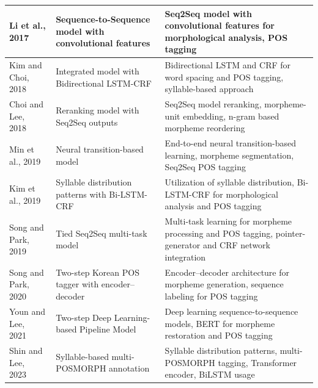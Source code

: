 \documentclass[AMS,STIX2COL]{WileyNJD-v2}
\begin{document}
\begin{table}[ht]
\begin{tabular}{|p{10mm}|p{24mm}|p{40mm}|}
            \hline
            Li et al., 2017~\cite{Li2017}         & Sequence-to-Sequence model with convolutional features & Seq2Seq model with convolutional features for morphological analysis, POS tagging                                \\
            \hline
            Kim and Choi, 2018~\cite{KimSW2018}   & Integrated model with Bidirectional LSTM-CRF           & Bidirectional LSTM and CRF for word spacing and POS tagging, syllable-based approach                             \\
            \hline
            Choi and Lee, 2018~\cite{ChoiYS2018}  & Reranking model with Seq2Seq outputs                   & Seq2Seq model reranking, morpheme-unit embedding, n-gram based morpheme reordering                               \\
            \hline
            Min et al., 2019~\cite{MinJW2019}     & Neural transition-based model                          & End-to-end neural transition-based learning, morpheme segmentation, Seq2Seq POS tagging                          \\
            \hline
            Kim et al., 2019~\cite{KimHM2019}     & Syllable distribution patterns with Bi-LSTM-CRF        & Utilization of syllable distribution, Bi-LSTM-CRF for morphological analysis and POS tagging                     \\
            \hline
            Song and Park, 2019~\cite{SongHJ2019} & Tied Seq2Seq multi-task model                          & Multi-task learning for morpheme processing and POS tagging, pointer-generator and CRF network integration       \\
            \hline
            Song and Park, 2020~\cite{SongHJ2020} & Two-step Korean POS tagger with encoder--decoder       & Encoder--decoder architecture for morpheme generation, sequence labeling for POS tagging                         \\
            \hline
            Youn and Lee, 2021~\cite{YounJY2021}  & Two-step Deep Learning-based Pipeline Model            & Deep learning sequence-to-sequence models, BERT for morpheme restoration and POS tagging                         \\
            \hline
            Shin and Lee, 2023~\cite{ShinHJ2023}  & Syllable-based multi-POSMORPH annotation               & Syllable distribution patterns, multi-POSMORPH tagging, Transformer encoder, BiLSTM usage                        \\
            \hline
        \end{tabular}
    \end{table}
\end{document}
